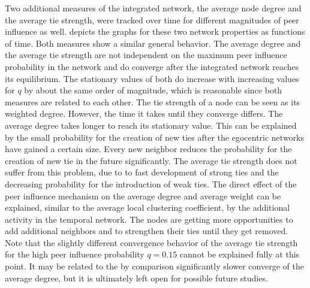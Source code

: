Two additional measures of the integrated network, the average node degree and the average tie strength, were tracked over time for different magnitudes of peer influence as well.
 depicts the graphs for these two network properties as functions of time.
Both measures show a similar general behavior.
The average degree and the average tie strength are not independent on the maximum peer influence probability in the network and do converge after the integrated network reaches its equilibrium.
The stationary values of both do increase with increasing values for \( q \) by about the same order of magnitude, which is reasonable since both measures are related to each other.
The tie strength of a node can be seen as its weighted degree.
However, the time it takes until they converge differs.
The average degree takes longer to reach its stationary value.
This can be explained by the small probability for the creation of new ties after the egocentric networks have gained a certain size.
Every new neighbor reduces the probability for the creation of new tie in the future significantly.
The average tie strength does not suffer from this problem, due to to fast development of strong ties and the decreasing probability for the introduction of weak ties. 
The direct effect of the peer influence mechanism on the average degree and average weight can be explained, similar to the average local clustering coefficient, by the additional activity in the temporal network.
The nodes are getting more opportunities to add additional neighbors and to strengthen their ties until they get removed.
Note that the slightly different convergence behavior of the average tie strength for the high peer influence probability \( q = 0.15 \) cannot be explained fully at this point. It may be related to the by comparison significantly slower converge of the average degree, but it is ultimately left open for possible future studies.


